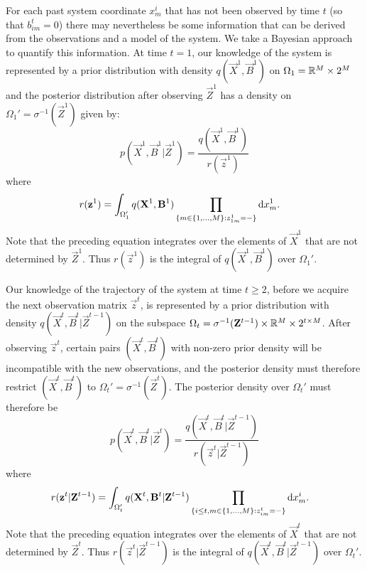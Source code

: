 For each past system coordinate $x^i_m$ that has not been observed by time $t$ (so that $b^t_{im} = 0$) there may nevertheless be some information that can be derived from the observations and a model of the system. We take a Bayesian approach to quantify this information. At time $t=1$, our knowledge of the system is represented by a prior distribution with density $q(\vec{X}^1, \vec{B}^1)$ on $\Omega_1 = \mathbb R^M \times 2^M$ and the posterior distribution after observing $\vec{Z}^1$ has a density on $\Omega_1' = \sigma^{-1}(\vec{Z}^1)$ given by:
\begin{equation*}
    p(\vec{X}^1, \vec{B}^1 |\vec{Z}^1) =
        \frac{q(\vec{X}^1, \vec{B}^1)}
        {r(\vec{z}^1)} 
\end{equation*}
where
\begin{align*}
    r(\mathbf{z}^1)  &= \int_{\Omega_1'} q(\mathbf{X}^1, \mathbf{B}^1) \prod_{ \{m \in \{1, \ldots, M \} : z^1_{1m} = - \} } \mathrm{d} x^1_m.
\end{align*}
Note that the preceding equation integrates over the elements of $\vec{X}^1$ that are not determined by $\vec{Z}^1$. Thus $r(\vec{z}^1)$ is the integral of $q(\vec{X}^1, \vec{B}^1)$ over $\Omega_1'$. 

Our knowledge of the trajectory of the system at time $t \geq 2$, before we acquire the next observation matrix $\vec{z}^t$, is represented by a prior distribution with density $q(\vec{X}^t, \vec{B}^t | \vec{Z}^{t-1})$ on the subspace $\Omega_t = \sigma^{-1}(\mathbf{Z}^{t-1}) \times \mathbb R^M \times 2^{t \times M}$. After observing $\vec{z}^t$, certain pairs $(\vec{X}^t, \vec{B}^t)$ with non-zero prior density will be incompatible with the new observations, and the posterior density must therefore restrict $(\vec{X}^t, \vec{B}^t)$ to $\Omega_t' = \sigma^{-1}(\vec{Z}^t)$. The posterior density over $\Omega_t'$ must therefore be
\begin{equation*}
    p(\vec{X}^t, \vec{B}^t |\vec{Z}^t) =
        \frac{q(\vec{X}^t, \vec{B}^t | \vec{Z}^{t-1})}
        {r(\vec{z}^t | \vec{Z}^{t-1})} 
\end{equation*}
where
\begin{align*}
    r(\mathbf{z}^t | \mathbf{Z}^{t-1})  &= \int_{\Omega_t'} q(\mathbf{X}^t, \mathbf{B}^t | \mathbf{Z}^{t-1}) \prod_{ \{ i \leq t, m \in \{1, \ldots, M \} : z^t_{im} = - \} } \mathrm{d} x^i_m.
\end{align*}
Note that the preceding equation integrates over the elements of $\vec{X}^t$ that are not determined by $\vec{Z}^t$. Thus $r(\vec{z}^t | \vec{Z}^{t-1})$ is the integral of $q(\vec{X}^t, \vec{B}^t | \vec{Z}^{t-1})$ over $\Omega_t'$. 

